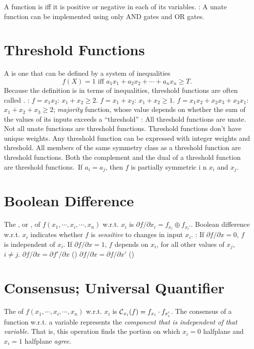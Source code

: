 \documentclass{myproc}
\def\sbf{\sf\bfseries}
\begin{document}
\w A function is  iff it is positive or negative in each of its
variables. 
\w {\sbf Corollary}: A unate function can be implemented using only AND gates
and OR gates.
\eit

\section{Threshold Functions}
\bit
\w A  is one that can be defined by a system of
inequalities 
\[ f(X) = 1 \mbox{\ iff\ } a_1x_1 + a_2x_2 + \cdots + a_nx_n \ge T.\]
\w Because the definition is in terms of inequalities, threshold functions are
often called . 
\w {}: 
  \ben
  \w $f = x_1x_2$: $x_1 + x_2 \ge 2$.
  \w $f = x_1 + x_2$: $x_1 + x_2 \ge 1$.
  \w $f = x_1x_2 + x_2x_3 + x_3x_1$: $x_1 + x_2 + x_3\ge 2$;
  {\em majority\/} function, 
    whose value depends on whether the sum of
   the values of its inputs exceeds a ``threshold''
  \een
\w {\sbf Properties}:
  \ben
  \w [(a)] All threshold functions are unate.
  \w [(b)] Not all unate functions are threshold functions.
  \w [(c)] Threshold functions don't have unique weights. Any
  threshold function can be expressed with integer weights and threshold.
  \w [(d)] All members of the same symmetry class as a threshold
  function are threshold functions. Both the complement and the dual of a
  threshold function are threshold functions.\
  \w [(e)] If $a_i = a_j$, then $f$ is partially symmetric i
   n $x_i$ and $x_j$.
   \een
\eit

\section{Boolean Difference}
\bit
\w The , or , of
  $f(x_1, \cdots, x_i, \cdots, x_n)$ w.r.t. $x_i$ is
  $\partial{f}/\partial{}x_i = f_{x_i} \oplus f_{x_i'}$.
\w Boolean difference w.r.t. $x_i$ indicates whether $f$ is {\em sensitive\/}
to changes in input $x_i$.
\w {\sbf Properties}:
  \ben
  \w [(a)] If $\partial f/\partial x = 0$, $f$ is independent of $x_i$.
  \w [(b)] If $\partial f/\partial x = 1$, $f$ depends on $x_i$, for all other
  values of $x_j$, $i \ne j$.
  \w [(c)] $\partial f/\partial x  = \partial f'/\partial x$ ()
  \w [(c')] $\partial f/\partial x  = \partial f/\partial x'$ 
  (\bb{complements})
  \een
\eit

\section{Consensus; Universal Quantifier}
\bit
\w The  of $f(x_1, \cdots, x_i, \cdots, x_n)$ w.r.t. $x_i$ is 
  ${\cal{}C}_{x_i}(f) = f_{x_i}\cdot f_{x_i'}$.
\w The consensus of a function w.r.t. a variable represents the {\em component
  that is independent of that variable\/}.
\w That is, this operation finds the portion on which 
$x_i = 0$ halfplane and $x_i = 1$ halfplane {\em agree\/}.
\eit
\end{document}
